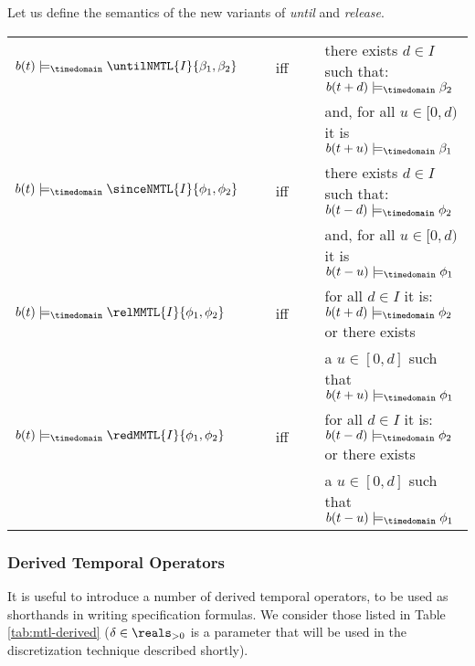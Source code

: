 \documentclass[a4paper]{article}
\newcommand{\modelstime}[1]{\models_{#1}}
\newcommand{\mdt}{\modelstime{\timedomain}}
\theoremstyle{plain}
\theoremstyle{definition}
\begin{document}
Let us define the semantics of the new variants of \emph{until} and \emph{release}. \\
\begin{tabular}{l c l}
  $b(t) \mdt \untilNMTL{I}{\beta_1, \beta_2}$ & \ \ \ iff\ \ \ &
            there exists $d \in I$ such that: $b(t+d) \mdt \beta_2$  \\
  &  &      and, for all $u \in [0, d)$ it is $b(t+u) \mdt \beta_1$  \\

  $b(t) \mdt \sinceNMTL{I}{\phi_1, \phi_2}$ & \ \ \ iff\ \ \ &
            there exists $d \in I$ such that: $b(t-d) \mdt \phi_2$  \\
  &  &      and, for all $u \in [0, d)$ it is $b(t-u) \mdt \phi_1$  \\









  $b(t) \mdt \relMMTL{I}{\phi_1, \phi_2}$ & \ \ \ iff\ \ \ &
            for all $d \in I$ it is: $b(t+d) \mdt \phi_2$ or there exists \\
  &  &       a $u \in [0, d]$ such that $b(t+u) \mdt \phi_1$  \\

  $b(t) \mdt \redMMTL{I}{\phi_1, \phi_2}$ & \ \ \ iff\ \ \ &
            for all $d \in I$ it is: $b(t-d) \mdt \phi_2$ or there exists \\
  &  &       a $u \in [0, d]$ such that $b(t-u) \mdt \phi_1$
\end{tabular}



\subsubsection{Derived Temporal Operators}
It is useful to introduce a number of derived temporal operators, to be used as shorthands in writing specification formulas.
We consider those listed in Table \ref{tab:mtl-derived} ($\delta \in \reals_{> 0}$ is a parameter that will be used in the discretization technique described shortly).
\end{document}
